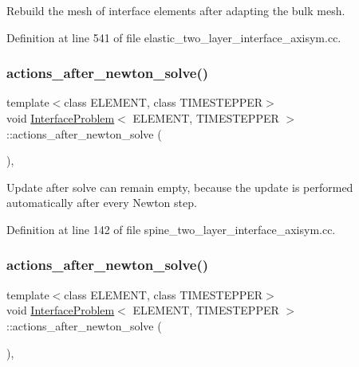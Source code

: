 Rebuild the mesh of interface elements after adapting the bulk mesh. 



Definition at line 541 of file elastic\+\_\+two\+\_\+layer\+\_\+interface\+\_\+axisym.\+cc.

\mbox{\label{classInterfaceProblem_aedc2e58b3d2f5f8c898a21ba2d245cee}} 
\subsubsection{\texorpdfstring{actions\+\_\+after\+\_\+newton\+\_\+solve()}{actions\_after\_newton\_solve()}\hspace{0.1cm}{\footnotesize\ttfamily [1/2]}}
{\footnotesize\ttfamily template$<$class E\+L\+E\+M\+E\+NT, class T\+I\+M\+E\+S\+T\+E\+P\+P\+ER$>$ \\
void \hyperlink{classInterfaceProblem}{Interface\+Problem}$<$ E\+L\+E\+M\+E\+NT, T\+I\+M\+E\+S\+T\+E\+P\+P\+ER $>$\+::actions\+\_\+after\+\_\+newton\+\_\+solve (\begin{DoxyParamCaption}{ }\end{DoxyParamCaption})\hspace{0.3cm}{\ttfamily [inline]}, {\ttfamily [private]}}



Update after solve can remain empty, because the update is performed automatically after every Newton step. 



Definition at line 142 of file spine\+\_\+two\+\_\+layer\+\_\+interface\+\_\+axisym.\+cc.

\mbox{\label{classInterfaceProblem_aedc2e58b3d2f5f8c898a21ba2d245cee}} 
\subsubsection{\texorpdfstring{actions\+\_\+after\+\_\+newton\+\_\+solve()}{actions\_after\_newton\_solve()}\hspace{0.1cm}{\footnotesize\ttfamily [2/2]}}
{\footnotesize\ttfamily template$<$class E\+L\+E\+M\+E\+NT, class T\+I\+M\+E\+S\+T\+E\+P\+P\+ER$>$ \\
void \hyperlink{classInterfaceProblem}{Interface\+Problem}$<$ E\+L\+E\+M\+E\+NT, T\+I\+M\+E\+S\+T\+E\+P\+P\+ER $>$\+::actions\+\_\+after\+\_\+newton\+\_\+solve (\begin{DoxyParamCaption}{ }\end{DoxyParamCaption})\hspace{0.3cm}{\ttfamily [inline]}, {\ttfamily [private]}}



